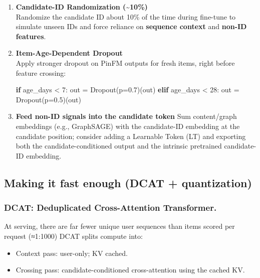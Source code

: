\documentclass[
  letterpaper,
  DIV=11,
  numbers=noendperiod]{scrartcl}
\newenvironment{Shaded}{\begin{snugshade}}{\end{snugshade}}
\newcommand{\ControlFlowTok}[1]{\textcolor[rgb]{0.00,0.23,0.31}{\textbf{#1}}}
\newcommand{\DecValTok}[1]{\textcolor[rgb]{0.68,0.00,0.00}{#1}}
\newcommand{\FloatTok}[1]{\textcolor[rgb]{0.68,0.00,0.00}{#1}}
\newcommand{\NormalTok}[1]{\textcolor[rgb]{0.00,0.23,0.31}{#1}}
\newcommand{\OperatorTok}[1]{\textcolor[rgb]{0.37,0.37,0.37}{#1}}
\begin{document}
\begin{enumerate}
\def\labelenumi{\arabic{enumi}.}
\item
  \textbf{Candidate-ID Randomization (\textasciitilde10\%)}\\
  Randomize the candidate ID about 10\% of the time during fine-tune to
  simulate unseen IDs and force reliance on \textbf{sequence context}
  and \textbf{non-ID features}.
\item
  \textbf{Item-Age-Dependent Dropout}\\
  Apply stronger dropout on PinFM outputs for fresh items, right before
  feature crossing:

\begin{Shaded}
\begin{Highlighting}[]
\ControlFlowTok{if}\NormalTok{ age\_days }\OperatorTok{\textless{}} \DecValTok{7}\NormalTok{:}
\NormalTok{    out }\OperatorTok{=}\NormalTok{ Dropout(p}\OperatorTok{=}\FloatTok{0.7}\NormalTok{)(out)}
\ControlFlowTok{elif}\NormalTok{ age\_days }\OperatorTok{\textless{}} \DecValTok{28}\NormalTok{:}
\NormalTok{    out }\OperatorTok{=}\NormalTok{ Dropout(p}\OperatorTok{=}\FloatTok{0.5}\NormalTok{)(out)}
\end{Highlighting}
\end{Shaded}
\item
  \textbf{Feed non-ID signals into the candidate token} Sum
  content/graph embeddings (e.g., GraphSAGE) with the candidate-ID
  embedding at the candidate position; consider adding a Learnable Token
  (LT) and exporting both the candidate-conditioned output and the
  intrinsic pretrained candidate-ID embedding.
\end{enumerate}

\subsection{Making it fast enough (DCAT +
quantization)}\label{making-it-fast-enough-dcat-quantization}

\subsubsection{DCAT: Deduplicated Cross-Attention
Transformer.}\label{dcat-deduplicated-cross-attention-transformer.}

At serving, there are far fewer unique user sequences than items scored
per request (≈1:1000) DCAT splits compute into:

\begin{itemize}
\item
  Context pass: user-only; KV cached.
\item
  Crossing pass: candidate-conditioned cross-attention using the cached
  KV.
\end{itemize}
\end{document}
